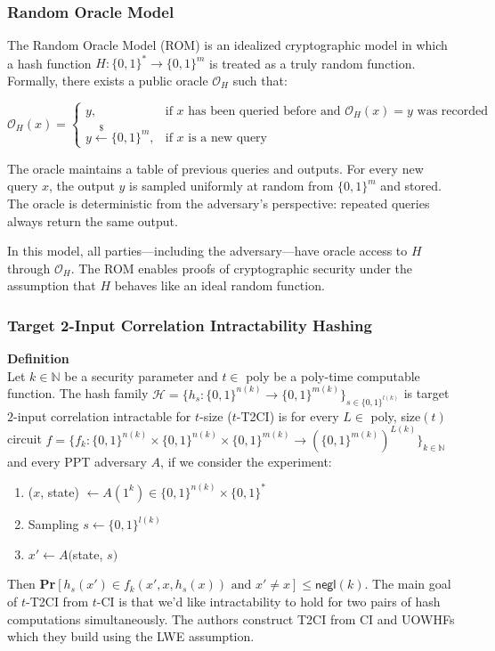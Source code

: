 \documentclass[12pt]{article}%
\newcommand{\N}{\mathbb{N}}
\begin{document}
\subsubsection{Random Oracle Model}

The Random Oracle Model (ROM) is an idealized cryptographic model in which a hash function $H : \{0,1\}^* \to \{0,1\}^m$ is treated as a truly random function. Formally, there exists a public oracle $\mathcal{O}_H$ such that:

\[
\mathcal{O}_H(x) = 
\begin{cases}
y, & \text{if } x \text{ has been queried before and } \mathcal{O}_H(x) = y \text{ was recorded} \\
y \xleftarrow{\$} \{0,1\}^m, & \text{if } x \text{ is a new query}
\end{cases}
\]

The oracle maintains a table of previous queries and outputs. For every new query $x$, the output $y$ is sampled uniformly at random from $\{0,1\}^m$ and stored. The oracle is deterministic from the adversary's perspective: repeated queries always return the same output.

In this model, all parties—including the adversary—have oracle access to $H$ through $\mathcal{O}_H$. The ROM enables proofs of cryptographic security under the assumption that $H$ behaves like an ideal random function.

\subsubsection{Target 2-Input Correlation Intractability Hashing}

\textbf{Definition}\\

Let $k \in \N$ be a security parameter and $t \in $ poly be a poly-time computable function. The hash family $\mathcal{H} = \{h_s:\{0, 1\}^{n(k)} \to \{0, 1\}^{m(k)}\}_{s \in \{0, 1\}^{l(k)}}$ is target $2$-input correlation intractable for $t$-size ($t$-T2CI) is for every $L \in $ poly, size$(t)$ circuit $f = \{f_k:\{0, 1\}^{n(k)} \times \{0, 1\}^{n(k)} \times \{0, 1\}^{m(k)} \to (\{0, 1\}^{m(k)})^{L(k)}\}_{k \in \N}$ and every PPT adversary $A$, if we consider the experiment: \begin{enumerate}
    \item ($x$, state) $\xleftarrow{} A(1^k) \in \{0, 1\}^{n(k)} \times \{0, 1\}^*$
    \item Sampling $s \xleftarrow{} \{0, 1\}^{l(k)}$
    \item $x' \xleftarrow{} A($state, $s)$
\end{enumerate} Then \textbf{Pr}$[h_s(x') \in f_k(x' , x, h_s(x)) \text{ and } x' \neq x] \leq \textsf{negl}(k)$. The main goal of $t$-T2CI from $t$-CI is that we'd like intractability to hold for two pairs of hash computations simultaneously. The authors construct T2CI from CI and UOWHFs which they build using the LWE assumption.
\end{document}
